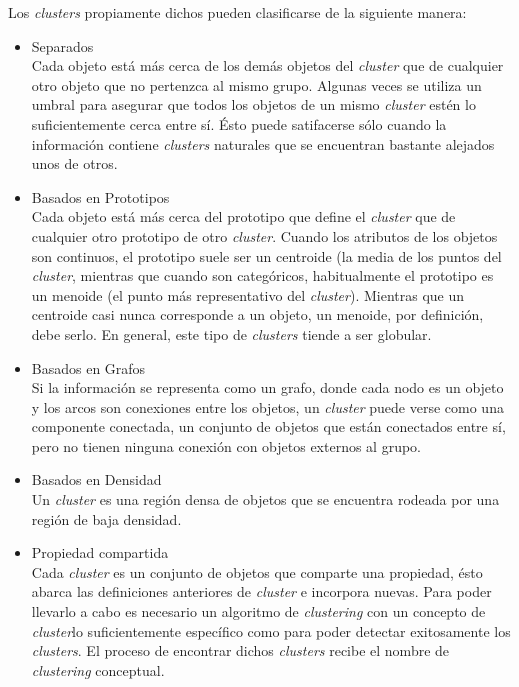 Los \textit{clusters} propiamente dichos pueden clasificarse de la siguiente manera:

\begin{itemize}
 \item Separados \\
 Cada objeto está más cerca de los demás objetos del \textit{cluster} que de cualquier otro objeto que no pertenzca
 al mismo grupo. Algunas veces se utiliza un umbral para asegurar que todos los  objetos de un mismo \textit{cluster}
 estén lo suficientemente cerca entre sí. Ésto puede satifacerse sólo cuando la información contiene \textit{clusters}
 naturales que se encuentran bastante alejados unos de otros.
 \item Basados en Prototipos \\
 Cada objeto está más cerca del prototipo que define el \textit{cluster} que de cualquier otro prototipo de otro
 \textit{cluster}. Cuando los atributos de los objetos son continuos, el prototipo suele ser un centroide (la media de
 los puntos del \textit{cluster}, mientras que cuando son categóricos, habitualmente el prototipo es un menoide
 (el punto más representativo del \textit{cluster}). Mientras que un centroide casi nunca corresponde a un objeto, un
 menoide, por definición, debe serlo. En general, este tipo de \textit{clusters} tiende a ser globular.
 \item Basados en Grafos \\
 Si la información se representa como un grafo, donde cada nodo es un objeto y los arcos son conexiones entre los
 objetos, un \textit{cluster} puede verse como una componente conectada, un conjunto de objetos que están conectados
 entre sí, pero no tienen ninguna conexión con objetos externos al grupo.
 \item Basados en Densidad \\
 Un \textit{cluster} es una región densa de objetos que se encuentra rodeada por una región de baja densidad.
 \item Propiedad compartida \\
 Cada \textit{cluster} es un conjunto de objetos que comparte una propiedad, ésto abarca las definiciones anteriores
 de \textit{cluster} e incorpora nuevas. Para poder llevarlo a cabo es necesario un algoritmo de \textit{clustering}
 con un concepto de \textit{cluster}lo suficientemente específico como para poder detectar exitosamente los
 \textit{clusters}. El proceso de encontrar dichos \textit{clusters} recibe el nombre de \textit{clustering} conceptual.
\end{itemize}

